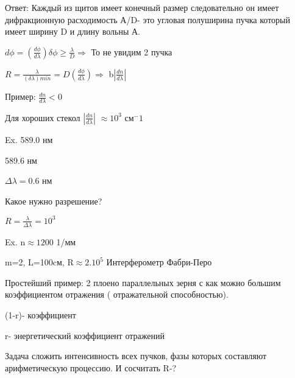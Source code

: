 \documentclass[12pt]{article}
\begin{document}
Ответ: Каждый из щитов имеет конечный размер следовательно он имеет дифракционную расходимость А/D- это угловая полуширина пучка который имеет ширину D и длину вольны А.   

$d\phi=(\frac{d\phi}{d\lambda})\delta\phi \geq \frac{\lambda}{D} \Rightarrow$  То не увидим 2 пучка

 $R=\frac{\lambda}{(\delta\lambda)min}=D(\frac{d\phi}{d\lambda}) \Rightarrow$ b$\left|\frac{dn}{d\lambda}\right|$ 

Пример: $\frac{dn}{d\lambda}<0$

Для хороших стекол $\left|\frac{dn}{d\lambda}\right|$ $\approx 10^3$ см$^-1$ 

Ex. 589.0 нм

589.6 нм

$\Delta\lambda=0.6$ нм

Какое нужно разрешение?

$R=\frac{\lambda}{\Delta\lambda}=$$10^3$

Ex. n$\approx 1200$ 1/мм

m=2, L=100cм, R$\approx 2.10^5$
\newpage \hspace{5cm} Интерферометр Фабри-Перо

Простейший пример: 2 плоено параллельных зерня с как можно большим коэффициентом отражения ( отражательной способностью).

(1-r)- коэффициент 

r- энергетический коэффициент отражений

Задача сложить интенсивность всех пучков, фазы которых составляют арифметическую процессию. И сосчитать R-?
\end{document}
